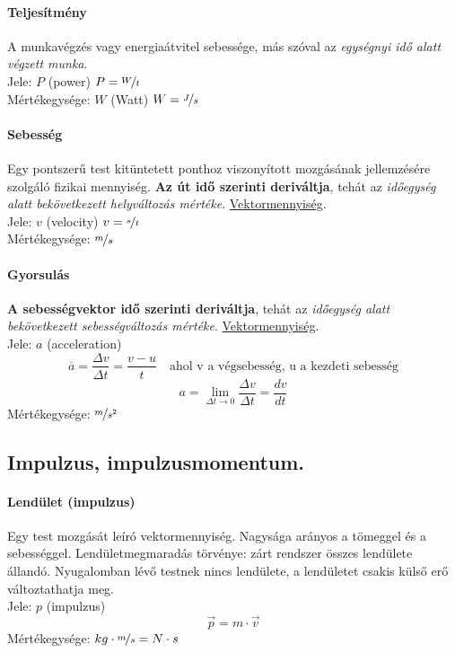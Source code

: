 \paragraph{Teljesítmény}
A munkavégzés vagy energiaátvitel sebessége, más szóval az \emph{egységnyi idő alatt végzett munka}.\\
Jele: $P$ (power) \quad $P = \nicefrac{W}{t}$\\
Mértékegysége: $W$ (Watt) \quad $W = \nicefrac{J}{s}$

\paragraph{Sebesség}
Egy pontszerű test kitüntetett ponthoz viszonyított mozgásának jellemzésére szolgáló fizikai mennyiség. \textbf{Az út idő szerinti deriváltja}, tehát az \emph{időegység alatt bekövetkezett helyváltozás mértéke}. \underline{Vektormennyiség}.\\
Jele: $v$ (velocity) \quad $v = \nicefrac{s}{t}$\\
Mértékegysége: $\nicefrac{m}{s}$

\paragraph{Gyorsulás}
\textbf{A sebességvektor idő szerinti deriváltja}, tehát az \emph{időegység alatt bekövetkezett sebességváltozás mértéke}. \underline{Vektormennyiség}.\\
Jele: $a$ (acceleration) 
$$\overline{a}=\frac{\Delta v}{\Delta t} = \frac{v-u}{t}\quad \text{ahol v a végsebesség, u a kezdeti sebesség}$$
$$a=\lim\limits_{\Delta t \to 0} \frac{\Delta v}{\Delta t} = \frac{dv}{dt}$$
Mértékegysége: $\nicefrac{m}{s^2}$

\subsection{Impulzus, impulzusmomentum.}
\paragraph{Lendület (impulzus)}
Egy test mozgását leíró vektormennyiség. Nagysága arányos a tömeggel és a sebességgel. Lendületmegmaradás törvénye: zárt rendszer összes lendülete állandó. Nyugalomban lévő testnek nincs lendülete, a lendületet csakis külső erő változtathatja meg.\\
Jele: $p$ (impulzus)	$$\vec{p}=m\cdot \vec{v}$$
Mértékegysége: $kg\cdot \nicefrac{m}{s} = N \cdot s$

